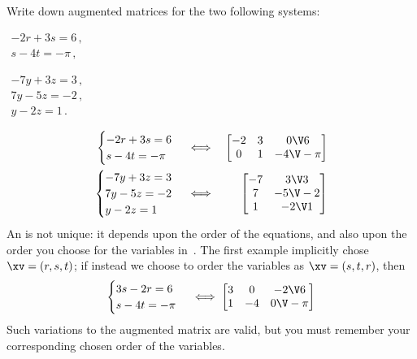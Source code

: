 \begin{example} 
Write down augmented matrices for the two following systems:
\begin{Parts}
\item \(\begin{array}{l} -2r+3s=6\,,\\s-4t=-\pi\,, \end{array}\)
\item \(\begin{array}{l}
-7y+3z=3\,,\\7y-5z=-2\,,\\y-2z=1\,.
\end{array}\)
\end{Parts}
\begin{solution} 
\begin{eqnarray*}
\begin{cases} -2r+3s=6\\s-4t=-\pi \end{cases}
&\iff&%
\begin{bmatrix} -2&3&0\V6\\ 0&1&-4\V-\pi \end{bmatrix}
\\
\begin{cases}
-7y+3z=3\\7y-5z=-2\\y-2z=1
\end{cases}
&\iff&%
\begin{bmatrix} -7&3\V3\\ 7&-5\V-2\\1&-2\V1 \end{bmatrix}
\end{eqnarray*} 
An  is not unique: it depends upon the order of the equations, and also upon the order you choose for the variables in~\xv.  
The first example implicitly chose \(\xv=(r,s,t)\); if instead we choose to order the variables as \(\xv=(s,t,r)\), then  
\begin{equation*}
\begin{cases} 3s-2r=6\\s-4t=-\pi \end{cases}
\iff%
\begin{bmatrix} 3&0&-2\V6\\ 1&-4&0\V-\pi \end{bmatrix}
\end{equation*} 
Such variations to the augmented matrix are valid, but you must remember your corresponding chosen order of the variables.
\end{solution}
\end{example}


